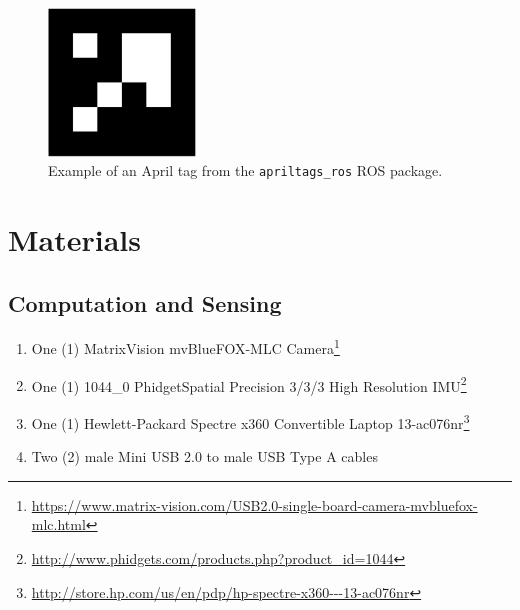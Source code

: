 \begin{figure}
  \centering
    \includegraphics[width=0.35\textwidth]{april_tag}
  \caption[Example April tag]{Example of an April tag from the \texttt{apriltags\_ros} ROS package.}
  \label{fig:april_tag}
\end{figure}

\section{Materials}
\subsection{Computation and Sensing}
\begin{enumerate}
\item One (1) MatrixVision mvBlueFOX-MLC Camera\footnote{\url{https://www.matrix-vision.com/USB2.0-single-board-camera-mvbluefox-mlc.html}}
\item One (1) 1044\_0 PhidgetSpatial Precision 3/3/3 High Resolution IMU\footnote{\url{http://www.phidgets.com/products.php?product_id=1044}}
\item One (1) Hewlett-Packard Spectre x360 Convertible Laptop 13-ac076nr\footnote{\url{http://store.hp.com/us/en/pdp/hp-spectre-x360---13-ac076nr}}
\item Two (2) male Mini USB 2.0 to male USB Type A cables
\end{enumerate}

